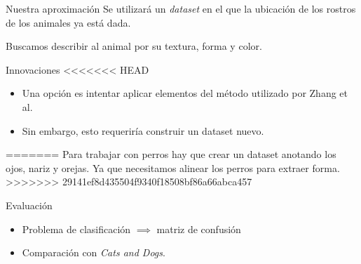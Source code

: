 \documentclass{beamer}
\begin{document}
	\begin{frame}{Nuestra aproximación}
        Se utilizará un \emph{dataset} en el que la ubicación de los rostros de
        los animales ya está dada.

		Buscamos describir al animal por su textura, forma y color.
	\end{frame}
	\begin{frame}{Innovaciones}
<<<<<<< HEAD
        \begin{itemize}
            \item Una opción es intentar aplicar elementos del método utilizado
                por Zhang et al.
            \item Sin embargo, esto requeriría construir un dataset nuevo.
        \end{itemize}
=======
		Para trabajar con perros hay que crear un dataset anotando los ojos, nariz y orejas.
		Ya que necesitamos alinear los perros para extraer forma.
>>>>>>> 29141ef8d435504f9340f18508bf86a66abca457
	\end{frame}
	\begin{frame}{Evaluación}
        \begin{itemize}
            \item Problema de clasificación $\implies$ matriz de confusión
            \item Comparación con \emph{Cats and Dogs}.
        \end{itemize}
	\end{frame}
\end{document}
